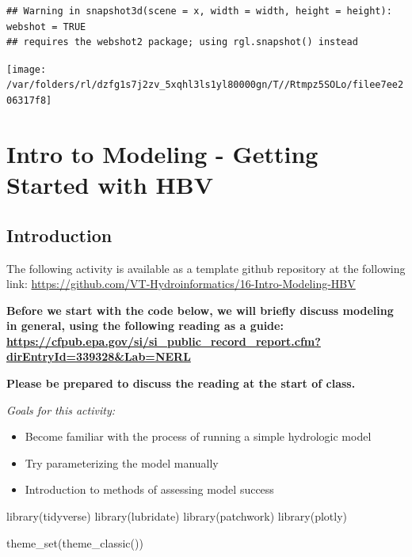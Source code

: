 \documentclass[
]{book}
\newenvironment{Shaded}{\begin{snugshade}}{\end{snugshade}}
\newcommand{\FunctionTok}[1]{\textcolor[rgb]{0.00,0.00,0.00}{#1}}
\newcommand{\NormalTok}[1]{#1}
\providecommand{\tightlist}{%
  \setlength{\itemsep}{0pt}\setlength{\parskip}{0pt}}
\begin{document}
\begin{verbatim}
## Warning in snapshot3d(scene = x, width = width, height = height): webshot = TRUE
## requires the webshot2 package; using rgl.snapshot() instead
\end{verbatim}

\texttt{[image: /var/folders/rl/dzfg1s7j2zv\_5xqhl3ls1yl80000gn/T//Rtmpz5SOLo/filee7ee206317f8]}

\hypertarget{modelingintro}{%
\chapter{Intro to Modeling - Getting Started with HBV}\label{modelingintro}}

\hypertarget{introduction-4}{%
\section{Introduction}\label{introduction-4}}

The following activity is available as a template github repository at the following link: \url{https://github.com/VT-Hydroinformatics/16-Intro-Modeling-HBV}

\textbf{Before we start with the code below, we will briefly discuss modeling in general, using the following reading as a guide: \url{https://cfpub.epa.gov/si/si_public_record_report.cfm?dirEntryId=339328\&Lab=NERL}}

\textbf{Please be prepared to discuss the reading at the start of class.}

\emph{Goals for this activity:}

\begin{itemize}
\tightlist
\item
  Become familiar with the process of running a simple hydrologic model
\item
  Try parameterizing the model manually
\item
  Introduction to methods of assessing model success
\end{itemize}

\begin{Shaded}
\begin{Highlighting}[]
\FunctionTok{library}\NormalTok{(tidyverse)}
\FunctionTok{library}\NormalTok{(lubridate)}
\FunctionTok{library}\NormalTok{(patchwork)}
\FunctionTok{library}\NormalTok{(plotly)}

\FunctionTok{theme\_set}\NormalTok{(}\FunctionTok{theme\_classic}\NormalTok{())}
\end{Highlighting}
\end{Shaded}
\end{document}
